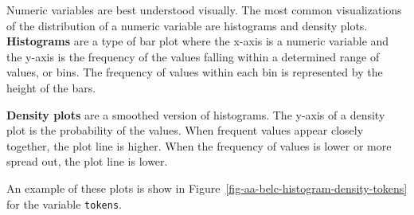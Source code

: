 \documentclass[
  letterpaper,
]{latex/krantz}
\theoremstyle{definition}
\theoremstyle{remark}
\begin{document}
Numeric variables are best understood visually. The most common
visualizations of the distribution of a numeric variable are histograms
and density plots. \textbf{Histograms} are a type of bar plot where the
x-axis is a numeric variable and the y-axis is the frequency of the
values falling within a determined range of values, or bins. The
frequency of values within each bin is represented by the height of the
bars.

\textbf{Density plots} are a smoothed version of histograms. The y-axis
of a density plot is the probability of the values. When frequent values
appear closely together, the plot line is higher. When the frequency of
values is lower or more spread out, the plot line is lower.

An example of these plots is show in
Figure~\ref{fig-aa-belc-histogram-density-tokens} for the variable
\texttt{tokens}.
\end{document}

